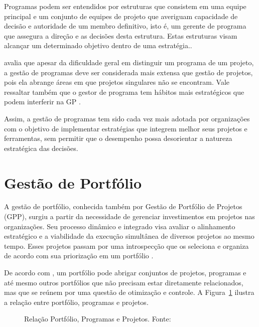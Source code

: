   Programas podem ser entendidos por estruturas que consistem em uma equipe principal e um conjunto de equipes de projeto que averiguam capacidade de decisão e autoridade de um membro definitivo, isto é, um gerente de programa que assegura a direção e as decisões desta estrutura. Estas estruturas visam alcançar um determinado objetivo dentro de uma estratégia.\cite{brown2008handbook}.

   avalia que apesar da dificuldade geral em distinguir um programa de um projeto, a gestão de programas deve ser considerada mais extensa que gestão de projetos, pois ela abrange áreas em que projetos singulares não se encontram. Vale ressaltar também que o gestor de programa tem hábitos mais estratégicos que podem interferir na GP \cite{lycett2004289}.

  Assim, a gestão de programas tem sido cada vez mais adotada por organizações com o objetivo de implementar estratégias que integrem melhor seus projetos e ferramentas, sem permitir que o desempenho possa desorientar a natureza estratégica das decisões.

\section{Gestão de Portfólio}

  A gestão de portfólio, conhecida também por Gestão de Portfólio de Projetos (GPP), surgiu a partir da necessidade de gerenciar investimentos em projetos nas organizações. Seu processo dinâmico e integrado visa avaliar o alinhamento estratégico e a viabilidade da execução simultânea de diversos projetos ao mesmo tempo. Esses projetos passam por uma introspecção que os seleciona e organiza de acordo com sua priorização em um portfólio \cite{meredith2011project, kerzner2013project}.

  De acordo com , um portfólio pode abrigar conjuntos de projetos, programas e até mesmo outros portfólios que não precisam estar diretamente relacionados, mas que se reúnem por uma questão de otimização e controle. A Figura~\ref{port_prog_proj} ilustra a relação entre portfólio, programas e projetos.

  \begin{figure}[!h]
    \centering
    \caption{Relação Portfólio, Programas e Projetos. Fonte: \cite{pmi2006}}
    \label{port_prog_proj}
  \end{figure}


